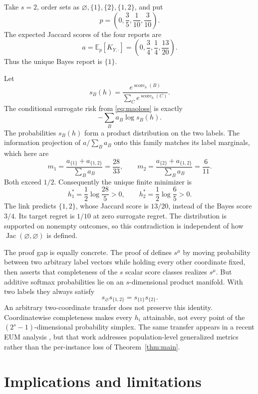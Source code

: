 \documentclass{article}
\newcommand{\E}{\mathbb E}
\newcommand{\1}{\mathbf 1}
\newcommand{\Jac}{\operatorname{Jac}}
\begin{document}
Take $s=2$, order sets as $\varnothing,\{1\},\{2\},\{1,2\}$, and put \[ p=\left(0,\frac35,\frac1{10},\frac3{10}\right). \tag{21}\label{eq:counterp} \] The expected Jaccard scores of the four reports are \[ a=\E_p[K_{Y,\cdot}] =\left(0,\frac34,\frac14,\frac{13}{20}\right). \tag{22}\label{eq:countera} \] Thus the unique Bayes report is $\{1\}$.

Let \[ s_B(h)=\frac{e^{\operatorname{score}_h(B)}} {\sum_Ce^{\operatorname{score}_h(C)}}. \] The conditional surrogate risk from \eqref{eq:maoloss} is exactly \[ -\sum_B a_B\log s_B(h). \tag{23}\label{eq:crossentropy} \] The probabilities $s_B(h)$ form a product distribution on the two labels. The information projection of $a/\sum_Ba_B$ onto this family matches its label marginals, which here are \[ m_1=\frac{a_{\{1\}}+a_{\{1,2\}}}{\sum_Ba_B}=\frac{28}{33}, \qquad m_2=\frac{a_{\{2\}}+a_{\{1,2\}}}{\sum_Ba_B}=\frac6{11}. \tag{24}\label{eq:marginals} \] Both exceed $1/2$. Consequently the unique finite minimizer is \[ h_1^*=\frac12\log\frac{28}{5}>0, \qquad h_2^*=\frac12\log\frac65>0. \tag{25}\label{eq:hstar} \] The link predicts $\{1,2\}$, whose Jaccard score is $13/20$, instead of the Bayes score $3/4$. Its target regret is $1/10$ at zero surrogate regret. The distribution is supported on nonempty outcomes, so this contradiction is independent of how $\Jac(\varnothing,\varnothing)$ is defined.

The proof gap is equally concrete. The proof of \citet{mao2024multilabel} defines $s^\mu$ by moving probability between two arbitrary label vectors while holding every other coordinate fixed, then asserts that completeness of the $s$ scalar score classes realizes $s^\mu$. But additive softmax probabilities lie on an $s$-dimensional product manifold. With two labels they always satisfy \[ s_\varnothing s_{\{1,2\}}=s_{\{1\}}s_{\{2\}}. \tag{26}\label{eq:productconstraint} \] An arbitrary two-coordinate transfer does not preserve this identity. Coordinatewise completeness makes every $h_i$ attainable, not every point of the $(2^s-1)$-dimensional probability simplex. The same transfer appears in a recent EUM analysis \citep{mohri2026mmo}, but that work addresses population-level generalized metrics rather than the per-instance loss of Theorem~\ref{thm:main}.

\section{Implications and limitations}
\label{sec:discussion}
\end{document}

